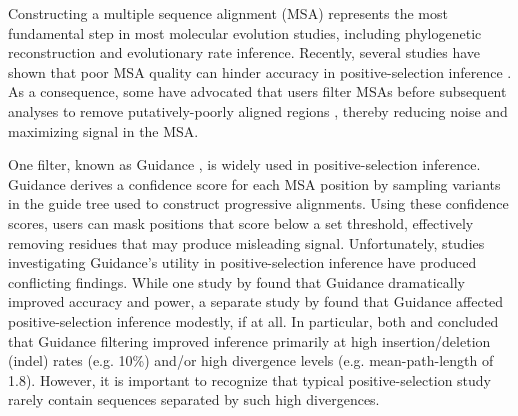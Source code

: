 \documentclass[11pt]{article}
\begin{document}
Constructing a multiple sequence alignment (MSA) represents the most fundamental step in most molecular evolution studies, including phylogenetic reconstruction and evolutionary rate inference. Recently, several studies have shown that poor MSA quality can hinder accuracy in positive-selection inference  \citep{Schneider2009, Fletcher2010, MarkovaRaina2011}. As a consequence, some have advocated that users filter MSAs before subsequent analyses to remove putatively-poorly aligned regions \citep{Privman2012,Jordan2012}, thereby reducing noise and maximizing signal in the MSA.

One filter, known as Guidance \citep{Penn2010}, is widely used in positive-selection inference. Guidance derives a confidence score for each MSA position by sampling variants in the guide tree used to construct progressive alignments. Using these confidence scores, users can mask positions that score below a set threshold, effectively removing residues that may produce misleading signal. Unfortunately, studies investigating Guidance's utility in positive-selection inference have produced conflicting findings. While one study by \citet{Privman2012} found that Guidance dramatically improved accuracy and power, a separate study by \citet{Jordan2012} found that Guidance affected positive-selection inference modestly, if at all. In particular, both \citet{Privman2012} and \citet{Jordan2012} concluded that Guidance filtering improved inference primarily at high insertion/deletion (indel) rates (e.g. 10\%) and/or high divergence levels (e.g. mean-path-length of 1.8). However, it is important to recognize that typical positive-selection study rarely contain sequences separated by such high divergences. 
\end{document}
